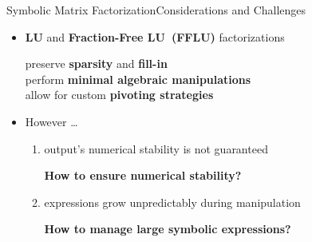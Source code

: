 \begin{frame}{Symbolic Matrix Factorization}{Considerations and Challenges}
  \begin{itemize}
    \item<2-> \textbf{\acs{LU}} and \textbf{Fraction-Free \acs{LU}~(\acs{FFLU})} factorizations \\
    \begin{small}
      \qquad preserve \textbf{sparsity} and \textbf{fill-in} \\
      \qquad perform \textbf{minimal algebraic manipulations} \\
      \qquad allow for custom \textbf{pivoting strategies}
    \end{small}
  \item<3->However \dots
    \begin{enumerate}
      \normalsize
      \item output's numerical stability is not guaranteed \\
      \begin{small}
        \qquad \textbf{How to ensure numerical stability?}
      \end{small}
      \item expressions grow unpredictably during manipulation \\
      \begin{small}
        \qquad \textbf{How to manage large symbolic expressions?}
      \end{small}
    \end{enumerate}
  \end{itemize}
\end{frame}


